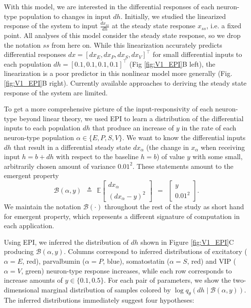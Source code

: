 \documentclass[11pt]{article}
\begin{document}
With this model, we are interested in the differential responses of each neuron-type population to changes in input $dh$. 
Initially, we studied the linearized response of the system to input $\frac{dx_{ss}}{dh}$ at the steady state response $x_{ss}$, i.e. a fixed point. 
All analyses of this model consider the steady state response, so we drop the notation $ss$ from here on.
While this linearization accurately predicts differential responses $dx = \left[ dx_{E} , dx_{P} , dx_{S} ,dx_{V} \right]^\top$  for small differential inputs to each population $dh = \left[ 0.1 , 0.1 , 0.1 , 0.1 \right]^\top$ (Fig \ref{fig:V1_EPI}B left), the linearization is a poor predictor in this nonlinear model more generally (Fig. \ref{fig:V1_EPI}B right).  
Currently available approaches to deriving the steady state response of the system are limited.

To get a more comprehensive picture of the input-responsivity of each neuron-type beyond linear theory, we used EPI to learn a distribution of the differential inputs to each population $dh$ that produce an increase of $y$ in the rate of each neuron-type population $\alpha \in \{E, P, S, V \}$.  
We want to know the differential inputs $dh$ that result in a differential steady state $dx_{\alpha}$ (the change in $x_{\alpha}$ when receiving input $h=b + dh$ with respect to the baseline $h = b$) of value $y$ with some small, arbitrarily chosen amount of variance  $0.01^2$.   
These statements amount to the emergent property 
\begin{equation}
\mathcal{B}(\alpha, y) ~~\triangleq~~ 
\mathbb{E} \begin{bmatrix} dx_{\alpha} \\ (dx_{\alpha} - y)^2 \end{bmatrix} ~~=~~ \begin{bmatrix} y \\ 0.01^2 \end{bmatrix}.
\end{equation}
We maintain the notation $\mathcal{B}(\cdot)$ throughout the rest of the study as short hand for emergent property, which represents a different signature of computation in each application. 

Using EPI, we inferred the distribution of $dh$ shown in Figure \ref{fig:V1_EPI}C producing $\mathcal{B}(\alpha, y)$.  
Columns correspond to inferred distributions of excitatory ($\alpha=E$, red), parvalbumin ($\alpha=P$, blue), somatostatin ($\alpha=S$, red) and VIP ($\alpha=V$, green) neuron-type response increases, while each row corresponds to increase amounts of $y \in \{0.1, 0.5\}$.  For each pair of parameters, we show the two-dimensional marginal distribution of samples colored by $\log q_\theta(dh \mid \mathcal{B}(\alpha, y))$.  The inferred distributions immediately suggest four hypotheses: \\
\end{document}
